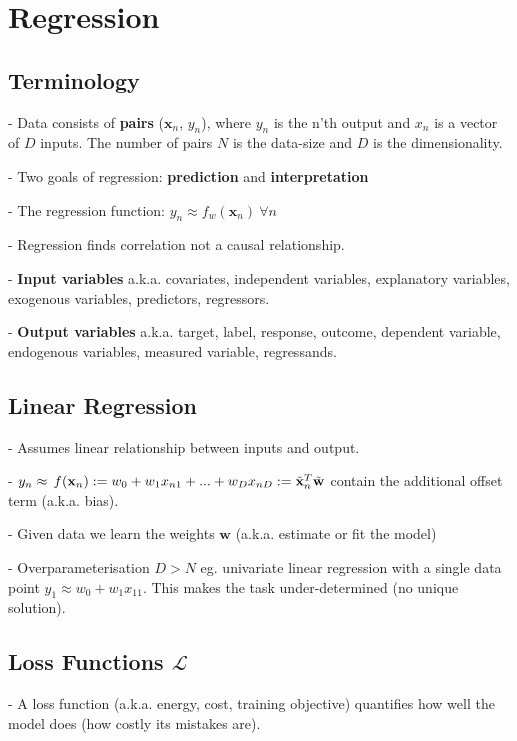 \section*{Regression}
\subsection*{Terminology}

- Data consists of \textbf{pairs} ($\mathbf{x}_n$, $y_n$), where $y_n$ is the n’th output and $x_n$ is a vector of $D$ inputs. The number of pairs $N$ is the data-size and $D$ is the dimensionality.

- Two goals of regression: \textbf{prediction} and \textbf{interpretation}

- The regression function: $y_{n}\approx f_w(\mathbf{x}_{n})\ \forall n$

- Regression finds correlation not a causal relationship.

- \textbf{Input variables} a.k.a. covariates, independent variables, explanatory variables, exogenous variables, predictors, regressors. 

- \textbf{Output variables} a.k.a. target, label, response, outcome, dependent variable, endogenous variables, measured variable, regressands.

\subsection*{Linear Regression}

- Assumes linear relationship between inputs and output.

- $y_{n}\approx\,f(\mathbf{x}_{n}) :=w_{0}+w_{1}x_{n1}+ ... +w_{D}x_{n D} \\ := \tilde{\bf x}_{n}^{T} \tilde{\bf w}$ contain the additional offset term (\small{a.k.a. bias}).

- Given data we learn the weights $\mathbf{w}$ (\small{a.k.a. estimate or fit the model})

- Overparameterisation $D > N$ eg. univariate linear regression with a single data point $y_{1}\approx w_{0}+w_{1}x_{11}$. This makes the task under-determined (no unique solution).

\subsection*{Loss Functions $\mathcal{L}$}

- A loss function (a.k.a. energy, cost, training objective) quantifies how well the model does (how costly its mistakes are).

